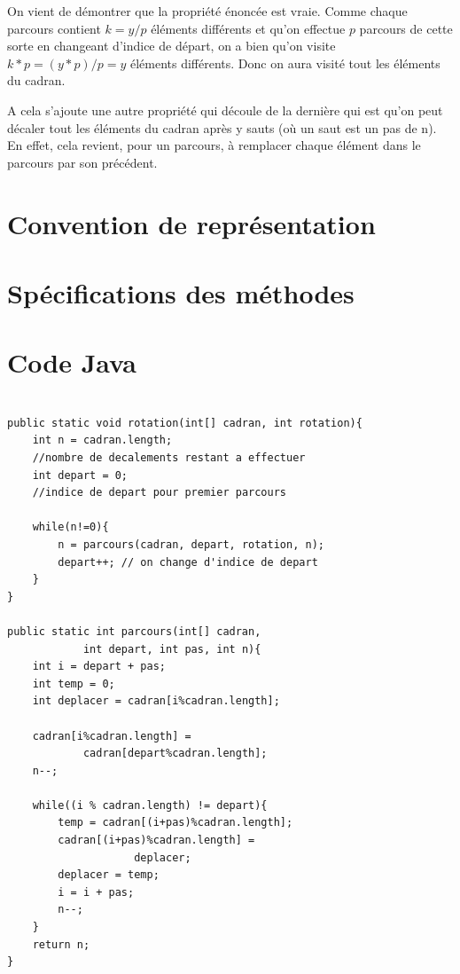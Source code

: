 \documentclass[a4paper, 12pt]{report}
\begin{document}
On vient de démontrer que la propriété énoncée est vraie. Comme chaque parcours contient $k = y/p$ éléments différents et qu'on effectue $p$ parcours de cette sorte en changeant d'indice de départ, on a bien qu'on visite $k*p = (y*p)/p = y $ éléments différents. Donc on aura visité tout les éléments du cadran. \newline

A cela s'ajoute une autre propriété qui découle de la dernière qui est qu'on peut décaler tout les éléments du cadran après y sauts (où un saut est un pas de n). En effet, cela revient, pour un parcours, à remplacer chaque élément dans le parcours par son précédent.

\section{Convention de représentation}

\section{Spécifications des méthodes}
\newpage
\section{Code Java}

\lstset{language=Java}

\begin{lstlisting}[frame=single]

public static void rotation(int[] cadran, int rotation){
	int n = cadran.length;  
	//nombre de decalements restant a effectuer
	int depart = 0;		
	//indice de depart pour premier parcours
		
	while(n!=0){
		n = parcours(cadran, depart, rotation, n);
		depart++; // on change d'indice de depart
	}
}

public static int parcours(int[] cadran, 
			int depart, int pas, int n){
	int i = depart + pas;	
	int temp = 0;	
	int deplacer = cadran[i%cadran.length]; 
		
	cadran[i%cadran.length] = 
			cadran[depart%cadran.length];
	n--;
		
	while((i % cadran.length) != depart){
		temp = cadran[(i+pas)%cadran.length];
		cadran[(i+pas)%cadran.length] = 
					deplacer;
		deplacer = temp;
		i = i + pas;
		n--;
	}
	return n;
}

\end{lstlisting} 
\end{document}
